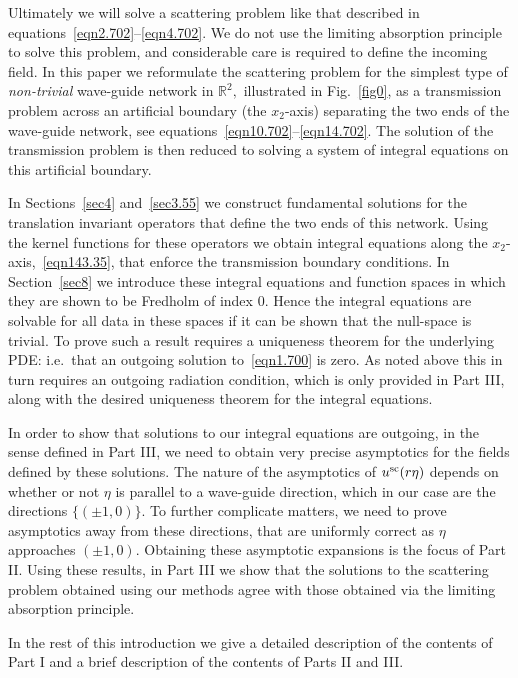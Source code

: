 \documentclass[11pt]{article}
\newcommand\bbR{\mathbb R}
\theoremstyle{definition}
\theoremstyle{remark}
\begin{document}
Ultimately we will solve a scattering problem like that described in
equations~\eqref{eqn2.702}--\eqref{eqn4.702}. We do not use the limiting
absorption principle to solve this problem, and considerable care is required to
define the incoming field. In this paper we reformulate the scattering problem
for the simplest type of {\em non-trivial} wave-guide network in $\bbR^2,$
illustrated in Fig.~\ref{fig0}, as a transmission problem across an artificial
boundary (the $x_2$-axis) separating the two ends of the wave-guide network, see
equations~\eqref{eqn10.702}--\eqref{eqn14.702}. The solution of the transmission
problem is then reduced to solving a system of integral equations on this
artificial boundary.

In Sections~\ref{sec4} and~\ref{sec3.55} we construct
fundamental solutions for the translation invariant operators that define the
two ends of this network. Using the kernel functions for these operators we
obtain integral equations along the $x_2$-axis,~\eqref{eqn143.35}, that enforce
the transmission boundary conditions. In Section~\ref{sec8} we introduce these
integral equations and function spaces in which they are shown to be Fredholm of
index 0. Hence the integral equations are solvable for all data in these spaces
if it can be shown that the null-space is trivial. To prove such a result
requires a uniqueness theorem for the underlying PDE: i.e.~that an outgoing
solution to~\eqref{eqn1.700} is zero.  As noted above this in turn requires an
outgoing radiation condition, which is only provided in Part III, along with the
desired uniqueness theorem for the integral equations.

In order to show that solutions to our integral equations are outgoing, in the
sense defined in Part III, we need to obtain very precise asymptotics for the
fields defined by these solutions. The nature of the asymptotics of
$u^{\operatorname{sc}}(r\eta)$ depends on whether or not $\eta$ is parallel to a wave-guide
direction, which in our case are the directions $\{(\pm 1,0)\}.$ To further
complicate matters, we need to prove asymptotics away from these directions,
that are uniformly correct as $\eta$ approaches $(\pm 1, 0).$ Obtaining these
asymptotic expansions is the focus of Part II. Using these results, in Part III
we show that the solutions to the scattering problem obtained using our methods
agree with those obtained via the limiting absorption principle.

In the rest of this introduction we give a detailed description of the contents
of Part I and a brief description of the contents of Parts II and III.
\end{document}
